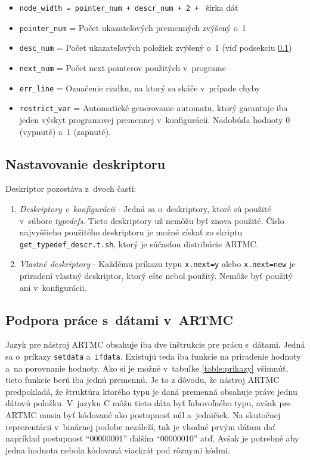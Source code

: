 \begin{itemize}
\item \texttt{node\_width = pointer\_num + descr\_num + 2 + } šírka dát  
\item \texttt{pointer\_num} = Počet ukazateľových premenných zvýšený o~1
\item \texttt{desc\_num} = Počet ukazateľových položiek zvýšený o~1 (viď podsekciu \ref{kap_descr})
\item \texttt{next\_num} = Počet next pointerov použitých v~programe
\item \texttt{err\_line} = Označenie riadku, na ktorý sa skáče v~prípade chyby
\item \texttt{restrict\_var} = Automatické generovanie automatu, ktorý garantuje iba jeden výskyt programovej premennej v~konfigurácii. Nadobúda hodnoty 0 (vypnuté) a~1 (zapnuté).
\end{itemize}


\subsection{Nastavovanie deskriptoru}
\label{kap_descr}
Deskriptor pozostáva z~dvoch častí:
\begin{enumerate}
\item \textit{Deskriptory v~konfigurácii} - Jedná sa o~deskriptory, ktoré sú použité v~súbore \textit{typedefs}. Tieto deskriptory už nemôžu byť znova použité. Číslo najvyššieho použitého deskriptoru je možné získať zo skriptu \texttt{get\_typedef\_descr.t.sh}, ktorý je súčasťou distribúcie ARTMC.
\item \textit{Vlastné deskriptory} - Každému príkazu typu \texttt{x.next=y} alebo \texttt{x.next=new} je priradení vlastný deskriptor, ktorý ešte nebol použitý. Nemôže byť použitý ani v~konfigurácii.
\end{enumerate}

\subsection{Podpora práce s~dátami v~ARTMC}
Jazyk pre nástroj ARTMC obsahuje iba dve inštrukcie pre prácu s~dátami. Jedná sa o~príkazy \texttt{setdata} a~\texttt{ifdata}. Existujú teda iba funkcie na priradenie hodnoty a~na porovnanie hodnoty. Ako si je možné v~tabuľke \ref{table:prikazy} všimnúť, tieto funkcie berú iba jednú premennú. Je to z dôvodu, že nástroj ARTMC predpokladá, že štruktúra ktorého typu je daná premenná obsahuje práve jednu dátovú položku. V~jazyku C môžu tieto dáta byť ľubovoľného typu, avšak pre ARTMC musia byť kódované ako postupnosť núl a~jedničiek. Na skutočnej reprezentácii v~binárnej podobe nezáleží, tak je vhodné prvým dátam dať napríklad postupnosť ``00000001'' ďalším ``00000010'' atď. Avšak je potrebné aby jedna hodnota nebola kódovaná viackrát pod rôznymi kódmi.

